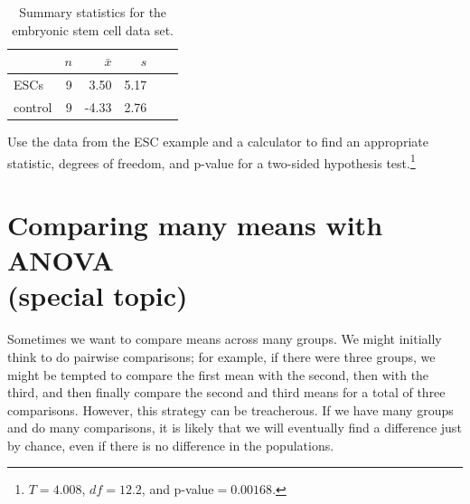 \begin{table}
\centering
\begin{tabular}{l rrrrr}
\hline
\hspace{10mm}	& $n$	& $\bar{x}$	& $s$  	 \\
\hline
ESCs		& 9		& 3.50		& 5.17  	\\
control		& 9		& -4.33		& 2.76  	 \\
\hline
\end{tabular}
\caption{Summary statistics for the embryonic stem cell data set.}
\label{summaryStatsForSheepHeartDataWhoReceivedMiceESCsForCalcSubsection}
\end{table}

\begin{exercise}Use the data from the ESC example and a calculator to find an appropriate statistic, degrees of freedom, and p-value for a two-sided hypothesis test.\footnote{$T=4.008$, $df=12.2$, and p-value$=0.00168$.}
\end{exercise}



\section[Comparing many means with ANOVA (special topic)]{Comparing many means with ANOVA\\(special topic) }
\label{anovaAndRegrWithCategoricalVariables}


Sometimes we want to compare means across many groups. We might initially think to do pairwise comparisons; for example, if there were three groups, we might be tempted to compare the first mean with the second, then with the third, and then finally compare the second and third means for a total of three comparisons. However, this strategy can be treacherous. If we have many groups and do many comparisons, it is likely that we will eventually find a difference just by chance, even if there is no difference in the populations.


